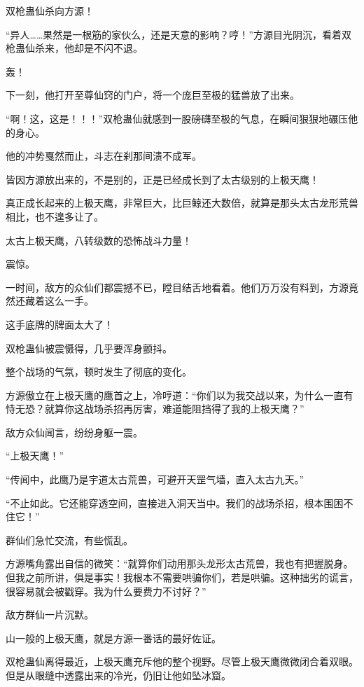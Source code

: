 
\begin{this_body}



双枪蛊仙杀向方源！

“异人……果然是一根筋的家伙么，还是天意的影响？哼！”方源目光阴沉，看着双枪蛊仙杀来，他却是不闪不退。

轰！

下一刻，他打开至尊仙窍的门户，将一个庞巨至极的猛兽放了出来。

“啊！这，这是！！！”双枪蛊仙就感到一股磅礴至极的气息，在瞬间狠狠地碾压他的身心。

他的冲势戛然而止，斗志在刹那间溃不成军。

皆因方源放出来的，不是别的，正是已经成长到了太古级别的上极天鹰！

真正成长起来的上极天鹰，非常巨大，比巨鲸还大数倍，就算是那头太古龙形荒兽相比，也不遑多让了。

太古上极天鹰，八转级数的恐怖战斗力量！

震惊。

一时间，敌方的众仙们都震撼不已，瞠目结舌地看着。他们万万没有料到，方源竟然还藏着这么一手。

这手底牌的牌面太大了！

双枪蛊仙被震慑得，几乎要浑身颤抖。

整个战场的气氛，顿时发生了彻底的变化。

方源傲立在上极天鹰的鹰首之上，冷哼道：“你们以为我交战以来，为什么一直有恃无恐？就算你这战场杀招再厉害，难道能阻挡得了我的上极天鹰？”

敌方众仙闻言，纷纷身躯一震。

“上极天鹰！”

“传闻中，此鹰乃是宇道太古荒兽，可避开天罡气墙，直入太古九天。”

“不止如此。它还能穿透空间，直接进入洞天当中。我们的战场杀招，根本围困不住它！”

群仙们急忙交流，有些慌乱。

方源嘴角露出自信的微笑：“就算你们动用那头龙形太古荒兽，我也有把握脱身。但我之前所讲，俱是事实！我根本不需要哄骗你们，若是哄骗。这种拙劣的谎言，很容易就会被戳穿。我为什么要费力不讨好？”

敌方群仙一片沉默。

山一般的上极天鹰，就是方源一番话的最好佐证。

双枪蛊仙离得最近，上极天鹰充斥他的整个视野。尽管上极天鹰微微闭合着双眼。但是从眼缝中透露出来的冷光，仍旧让他如坠冰窟。


\end{this_body}
